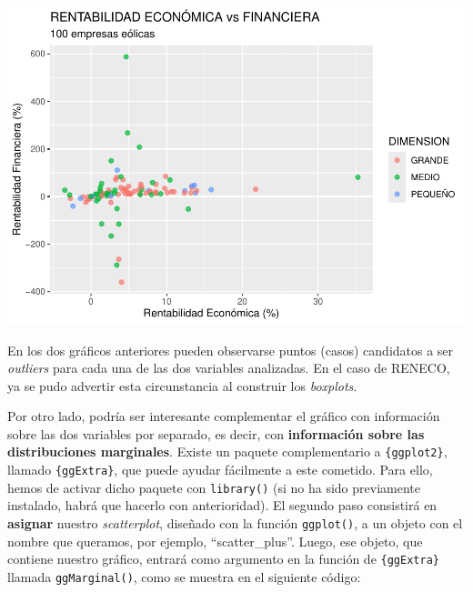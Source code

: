 \documentclass[
]{book}
\let\Oldincludegraphics\includegraphics
\renewcommand{\includegraphics}[2][]{%
  \Oldincludegraphics[#1]{#2}%
}
\begin{document}
\includegraphics{_main_files/figure-latex/unnamed-chunk-119-1.pdf}

En los dos gráficos anteriores pueden observarse puntos (casos) candidatos a ser \emph{outliers} para cada una de las dos variables analizadas. En el caso de RENECO, ya se pudo advertir esta circunstancia al construir los \emph{boxplots}.

Por otro lado, podría ser interesante complementar el gráfico con información sobre las dos variables por separado, es decir, con \textbf{información sobre las distribuciones marginales}. Existe un paquete complementario a \texttt{\{ggplot2\}}, llamado \texttt{\{ggExtra\}}, que puede ayudar fácilmente a este cometido. Para ello, hemos de activar dicho paquete con \texttt{library()} (si no ha sido previamente instalado, habrá que hacerlo con anterioridad). El segundo paso consistirá en \textbf{asignar} nuestro \emph{scatterplot}, diseñado con la función \texttt{ggplot()}, a un objeto con el nombre que queramos, por ejemplo, ``scatter\_plus''. Luego, ese objeto, que contiene nuestro gráfico, entrará como argumento en la función de \texttt{\{ggExtra\}} llamada \texttt{ggMarginal()}, como se muestra en el siguiente código:
\end{document}
